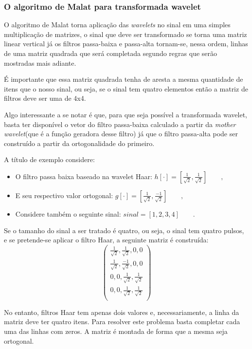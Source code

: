 \begin{myenv}{1.5}
			\subsubsection{O algoritmo de Malat para transformada wavelet}
				\par O algoritmo de Malat torna aplicação das \textit{wavelets} no sinal em uma simples multiplicação de matrizes, o sinal que deve ser transformado se torna uma matriz linear vertical já os filtros passa-baixa e passa-alta tornam-se, nessa ordem, linhas de uma matriz quadrada que será completada segundo regras que serão mostradas mais adiante.
				\par É importante que essa matriz quadrada tenha de aresta a mesma quantidade de itens que o nosso sinal, ou seja, se o sinal tem quatro elementos então a matriz de filtros deve ser uma de 4x4.
				\par Algo interessante a se notar é que, para que seja possível a transformada wavelet, basta ter disponível o vetor do filtro passa-baixa calculado a partir da \textit{mother wavelet}(que é a função geradora desse filtro) já que o filtro passa-alta pode ser construído a partir da ortogonalidade do primeiro.\\
				\par A título de exemplo considere:
				\begin{itemize}
					\item O filtro passa baixa baseado na wavelet Haar: $h[\cdot] = [\frac{1}{\sqrt{2}}, \frac{1}{\sqrt{2}}]\qquad,$
					\item E seu respectivo valor ortogonal: $g[\cdot] = [\frac{1}{\sqrt{2}}, \frac{-1}{\sqrt{2}}]\qquad,$
					\item Considere também o seguinte sinal:	$sinal = [1,2,3,4]\qquad.$
				\end{itemize}
	
				\par Se o tamanho do sinal a ser tratado é quatro, ou seja, o sinal tem quatro pulsos, e se pretende-se aplicar o filtro Haar, a seguinte matriz é construída:
				\begin{equation}
					\begin{pmatrix}
						\frac{1}{\sqrt{2}}, \frac{1}{\sqrt{2}}, 0, 0\\
						\frac{1}{\sqrt{2}}, \frac{-1}{\sqrt{2}}, 0, 0\\
						0, 0, \frac{1}{\sqrt{2}}, \frac{1}{\sqrt{2}}\\
						0, 0, \frac{1}{\sqrt{2}}, \frac{1}{\sqrt{2}}\\
						\label{eq:haarFilters}
					\end{pmatrix} 
				\end{equation}
				\par No entanto, filtros Haar tem apenas dois valores e, necessariamente, a linha da matriz deve ter quatro itens. Para resolver este problema basta completar cada uma das linhas com zeros. A matriz é montada de forma que a mesma seja ortogonal.
	

\end{myenv}
